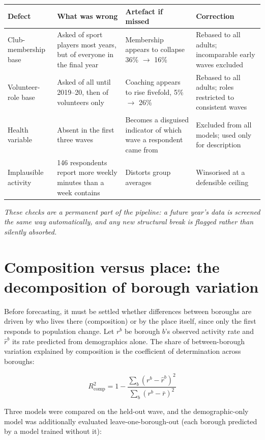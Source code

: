 \documentclass[ %
                    author={Ashrey Ashrey, Sanya Kapoor, Trisha Sharma, Yash Bhooshan Pandloskar},
                supervisor={Dr. Dalila O’Grady},
                    degree={MSc},
                     title={Using machine learning to forecast physical activity participation, volunteering and activity patterns in London},
                  subtitle={},
                      type={},
                      year={2021}]{dissertation}
\begin{document}
\begin{table}[!htb]
\centering
\small
\begin{tabularx}{\textwidth}{@{}lXXX@{}}
\toprule
\textbf{Defect} & \textbf{What was wrong} & \textbf{Artefact if missed} & \textbf{Correction} \\
\midrule
Club-membership base & Asked of sport players most years, but of everyone in the final year & Membership appears to collapse 36\% $\rightarrow$ 16\% & Rebased to all adults; incomparable early waves excluded \\
Volunteer-role base & Asked of all until 2019--20, then of volunteers only & Coaching appears to rise fivefold, 5\% $\rightarrow$ 26\% & Rebased to all adults; roles restricted to consistent waves \\
Health variable & Absent in the first three waves & Becomes a disguised indicator of which wave a respondent came from & Excluded from all models; used only for description \\
Implausible activity & 146 respondents report more weekly minutes than a week contains & Distorts group averages & Winsorised at a defensible ceiling \\
\bottomrule
\end{tabularx}
\end{table}

\noindent
\emph{These checks are a permanent part of the pipeline: a future year's data is screened the same way automatically, and any new structural break is flagged rather than silently absorbed.}

\section{Composition versus place: the decomposition of borough variation}

\noindent
Before forecasting, it must be settled whether differences between boroughs are driven by who lives there (composition) or by the place itself, since only the first responds to population change. Let \(r^b\) be borough \(b\)'s observed activity rate and \(\hat{r}^b\) its rate predicted from demographics alone. The share of between-borough variation explained by composition is the coefficient of determination across boroughs:

\[
R^2_{\mathrm{comp}}
=
1-
\frac{\sum_b (r^b-\hat{r}^b)^2}
{\sum_b (r^b-\bar{r})^2}
\]

Three models were compared on the held-out wave, and the demographic-only model was additionally evaluated leave-one-borough-out (each borough predicted by a model trained without it):
\end{document}
